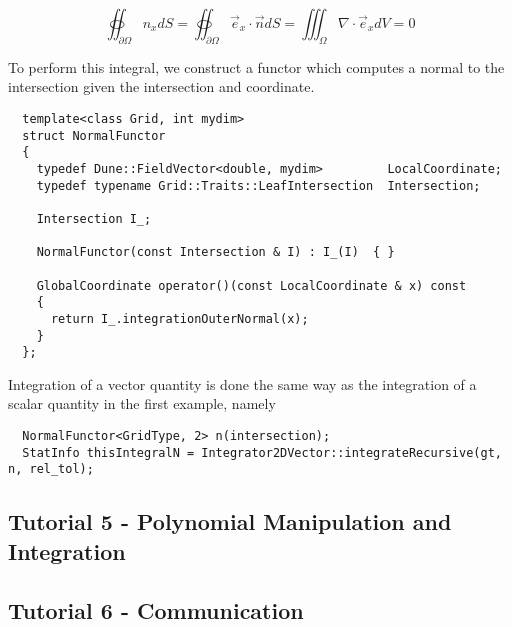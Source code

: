 \begin{equation}
	\oiint_{\partial \Omega} n_x dS = \oiint_{\partial \Omega} \vec{e}_x \cdot \vec{n} dS = \iiint_{\Omega} \nabla \cdot \vec{e}_x dV = 0
\end{equation}

\noindent
To perform this integral, we construct a functor which computes a normal to the intersection given the intersection and coordinate. \\

\begin{mybox}
\begin{lstlisting}
  template<class Grid, int mydim>
  struct NormalFunctor
  {
	typedef Dune::FieldVector<double, mydim>         LocalCoordinate;
	typedef typename Grid::Traits::LeafIntersection  Intersection;

	Intersection I_;

	NormalFunctor(const Intersection & I) : I_(I)  { }

	GlobalCoordinate operator()(const LocalCoordinate & x) const
    {
      return I_.integrationOuterNormal(x);
    }
  };
\end{lstlisting}
\end{mybox}

Integration of a vector quantity is done the same way as the integration of a scalar quantity in the first example, namely \\

\begin{mybox}
\begin{lstlisting}
  NormalFunctor<GridType, 2> n(intersection);
  StatInfo thisIntegralN = Integrator2DVector::integrateRecursive(gt, n, rel_tol);
\end{lstlisting}
\end{mybox}




\subsection{Tutorial 5 - Polynomial Manipulation and Integration}
\label{usage-howto-tutorial-polynomial}

\subsection{Tutorial 6 - Communication}
\label{usage-howto-tutorial-communication}

